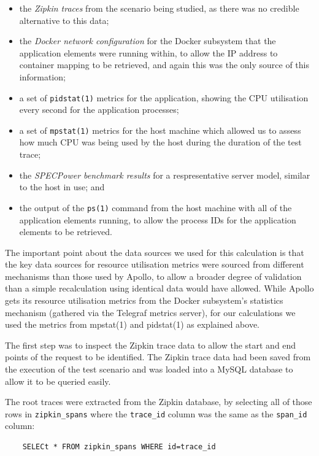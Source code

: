 \begin{itemize}
	\item the \emph{Zipkin traces} from the scenario being studied, as there was no credible alternative to this data;
	\item the \emph{Docker network configuration} for the Docker subsystem that the application elements were running within, to allow the IP address to container mapping to be retrieved, and again this was the only source of this information;
	\item a set of \texttt{pidstat(1)} metrics for the application, showing the CPU utilisation every second for the application processes;
	\item a set of \texttt{mpstat(1)} metrics for the host machine which allowed us to assess how much CPU was being used by the host during the duration of the test trace;
	\item the \emph{SPECPower benchmark results} for a respresentative server model, similar to the host in use; and
	\item the output of the \texttt{ps(1)} command from the host machine with all of the application elements running, to allow the process IDs for the application elements to be retrieved.
\end{itemize}

The important point about the data sources we used for this calculation is that the key data sources for resource utilisation metrics were sourced from different mechanisms than those used by Apollo, to allow a broader degree of validation than a simple recalculation using identical data would have allowed.  While Apollo gets its resource utilisation metrics from the Docker subsystem's statistics mechanism (gathered via the Telegraf metrics server), for our calculations we used the metrics from mpstat(1) and pidstat(1) as explained above.

The first step was to inspect the Zipkin trace data to allow the start and end points of the request to be identified.  The Zipkin trace data had been saved from the execution of the test scenario and was loaded into a MySQL database to allow it to be queried easily.

The root traces were extracted from the Zipkin database, by selecting all of those rows in \texttt{zipkin\_spans} where the \texttt{trace\_id} column was the same as the \texttt{span\_id} column:

\lstset{language=SQL}
\begin{lstlisting}
	SELECt * FROM zipkin_spans WHERE id=trace_id
\end{lstlisting}


